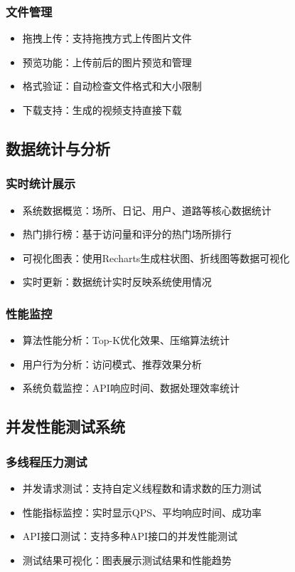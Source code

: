 \documentclass[12pt,a4paper]{article}
\begin{document}
\subsubsection{文件管理}
\begin{itemize}
    \item 拖拽上传：支持拖拽方式上传图片文件
    \item 预览功能：上传前后的图片预览和管理
    \item 格式验证：自动检查文件格式和大小限制
    \item 下载支持：生成的视频支持直接下载
\end{itemize}

\subsection{数据统计与分析}
\subsubsection{实时统计展示}
\begin{itemize}
    \item 系统数据概览：场所、日记、用户、道路等核心数据统计
    \item 热门排行榜：基于访问量和评分的热门场所排行
    \item 可视化图表：使用Recharts生成柱状图、折线图等数据可视化
    \item 实时更新：数据统计实时反映系统使用情况
\end{itemize}

\subsubsection{性能监控}
\begin{itemize}
    \item 算法性能分析：Top-K优化效果、压缩算法统计
    \item 用户行为分析：访问模式、推荐效果分析
    \item 系统负载监控：API响应时间、数据处理效率统计
\end{itemize}

\subsection{并发性能测试系统}
\subsubsection{多线程压力测试}
\begin{itemize}
    \item 并发请求测试：支持自定义线程数和请求数的压力测试
    \item 性能指标监控：实时显示QPS、平均响应时间、成功率
    \item API接口测试：支持多种API接口的并发性能测试
    \item 测试结果可视化：图表展示测试结果和性能趋势
\end{itemize}
\end{document}
